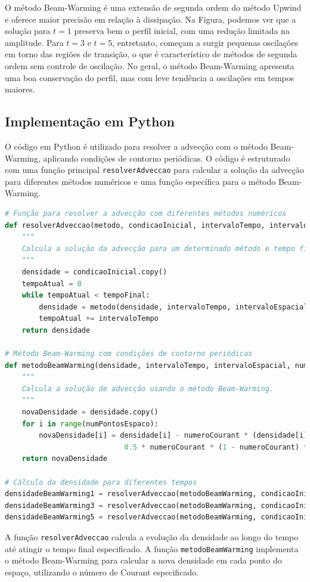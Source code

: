 O método Beam-Warming é uma extensão de segunda ordem do método Upwind e oferece maior precisão em relação à dissipação. Na Figura, podemos ver que a solução para \( t = 1 \) preserva bem o perfil inicial, com uma redução limitada na amplitude. Para \( t = 3 \) e \( t = 5 \), entretanto, começam a surgir pequenas oscilações em torno das regiões de transição, o que é característico de métodos de segunda ordem sem controle de oscilação. No geral, o método Beam-Warming apresenta uma boa conservação do perfil, mas com leve tendência a oscilações em tempos maiores.

\subsection{Implementação em Python}

O código em Python é utilizado para resolver a advecção com o método Beam-Warming, aplicando condições de contorno periódicas. O código é estruturado com uma função principal \texttt{resolverAdveccao} para calcular a solução da advecção para diferentes métodos numéricos e uma função específica para o método Beam-Warming.

\begin{lstlisting}[language=Python, caption={Código para resolver a advecção usando o método Beam-Warming}, label={lst:codigo_beam_warming}]
# Função para resolver a advecção com diferentes métodos numéricos
def resolverAdveccao(metodo, condicaoInicial, intervaloTempo, intervaloEspacial, numeroCourant, tempoFinal):
    """
    Calcula a solução da advecção para um determinado método e tempo final.
    """
    densidade = condicaoInicial.copy()
    tempoAtual = 0
    while tempoAtual < tempoFinal:
        densidade = metodo(densidade, intervaloTempo, intervaloEspacial, numeroCourant)
        tempoAtual += intervaloTempo
    return densidade

# Método Beam-Warming com condições de contorno periódicas
def metodoBeamWarming(densidade, intervaloTempo, intervaloEspacial, numeroCourant):
    """
    Calcula a solução de advecção usando o método Beam-Warming.
    """
    novaDensidade = densidade.copy()
    for i in range(numPontosEspaco):
        novaDensidade[i] = densidade[i] - numeroCourant * (densidade[i] - densidade[i-1]) - \
                            0.5 * numeroCourant * (1 - numeroCourant) * (densidade[i] - 2 * densidade[i-1] + densidade[i-2])
    return novaDensidade

# Cálculo da densidade para diferentes tempos
densidadeBeamWarming1 = resolverAdveccao(metodoBeamWarming, condicaoInicial, intervaloTempo, intervaloEspacial, numeroCourant, tempoFinal1)
densidadeBeamWarming3 = resolverAdveccao(metodoBeamWarming, condicaoInicial, intervaloTempo, intervaloEspacial, numeroCourant, tempoFinal3)
densidadeBeamWarming5 = resolverAdveccao(metodoBeamWarming, condicaoInicial, intervaloTempo, intervaloEspacial, numeroCourant, tempoFinal5)
\end{lstlisting}

A função \texttt{resolverAdveccao} calcula a evolução da densidade ao longo do tempo até atingir o tempo final especificado. A função \texttt{metodoBeamWarming} implementa o método Beam-Warming para calcular a nova densidade em cada ponto do espaço, utilizando o número de Courant especificado.
